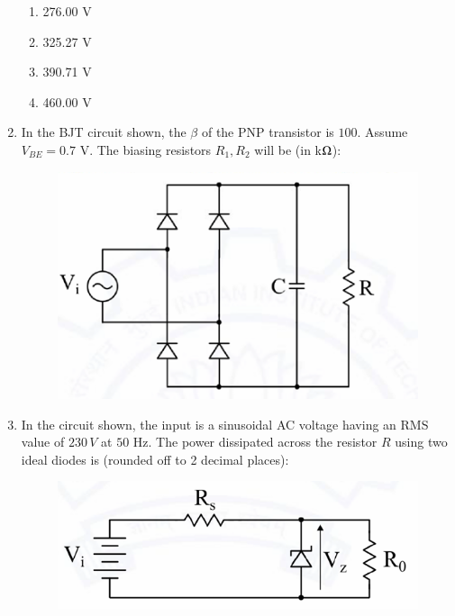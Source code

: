 \documentclass[journal,12pt,onecolumn]{IEEEtran}
\theoremstyle{remark}
\begin{document}
\begin{flushleft}
\begin{enumerate}
    \begin{multicols}{2}
    \begin{enumerate}
        \item 276.00 V
        \item 325.27 V
        \item 390.71 V
        \item 460.00 V
    \end{enumerate}
    \end{multicols}




\item In the BJT circuit shown, the $\beta$ of the PNP transistor is $100$.  
Assume $V_{BE} = 0.7$ V. The biasing resistors $R_1, R_2$ will be (in k$\ohm$):

\begin{figure}[H]
    \centering
    \includegraphics[width=0.5\columnwidth]{figs/34.png}
    \caption{}
    \label{fig:placeholder}
\end{figure}
\begin{enumerate}
\end{enumerate}


\item In the circuit shown, the input is a sinusoidal AC voltage having an RMS value of $230 \, V$ at $50$ Hz.  
The power dissipated across the resistor $R$ using two ideal diodes is (rounded off to 2 decimal places):

\begin{figure}[H]
    \centering
    \includegraphics[width=0.5\columnwidth]{figs/35.png}
    \caption{}
    \label{fig:placeholder}
\end{figure}


\end{enumerate}
\end{flushleft}
\end{document}

